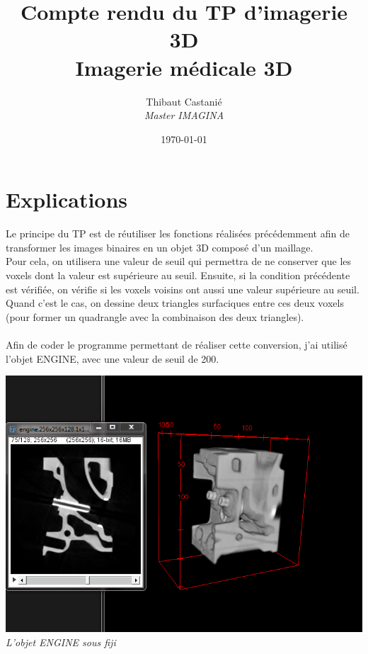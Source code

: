 \documentclass[a4paper,11pt]{article}
\begin{document}
\title{\textbf{Compte rendu du TP  d'imagerie 3D}\\Imagerie médicale 3D}
\author{Thibaut Castanié\\\textit{Master IMAGINA}}
\date{\today}

\maketitle
\thispagestyle{empty}

\newpage 
\section{Explications}
Le principe du TP est de réutiliser les fonctions réalisées précédemment afin  de transformer les images binaires en un objet 3D composé d'un maillage.\\
Pour cela, on utilisera une valeur de seuil qui permettra de ne conserver que les voxels dont la valeur est supérieure au seuil. Ensuite, si la condition précédente est vérifiée, on vérifie si les voxels voisins ont aussi une valeur supérieure au seuil. Quand c'est le cas, on dessine deux triangles surfaciques entre ces deux voxels (pour former un quadrangle avec la combinaison des deux triangles).\\
\\
Afin de coder le programme permettant de réaliser cette conversion, j'ai utilisé l'objet ENGINE, avec une valeur de seuil de 200.\\

\begin{center}
\includegraphics[scale=0.4]{engine.png}\\
\textit{L'objet ENGINE sous fiji}
\end{center}
\end{document}
